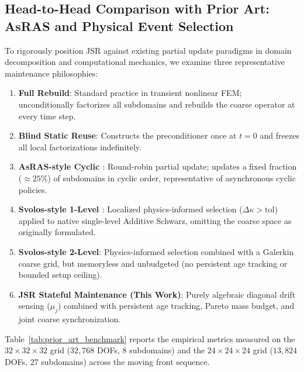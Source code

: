 \documentclass[preprint,12pt,3p]{elsarticle}
\begin{document}
\subsection{Head-to-Head Comparison with Prior Art: AsRAS and Physical Event Selection}
\label{subsec:prior_art_comparison}

To rigorously position JSR against existing partial update paradigms in domain decomposition and computational mechanics, we examine three representative maintenance philosophies:
\begin{enumerate}
    \item \textbf{Full Rebuild}: Standard practice in transient nonlinear FEM; unconditionally factorizes all subdomains and rebuilds the coarse operator at every time step.
    \item \textbf{Blind Static Reuse}: Constructs the preconditioner once at $t=0$ and freezes all local factorizations indefinitely.
    \item \textbf{AsRAS-style Cyclic \cite{berenguer2015asynchronous}}: Round-robin partial update; updates a fixed fraction ($\approx 25\%$) of subdomains in cyclic order, representative of asynchronous cyclic policies.
    \item \textbf{Svolos-style 1-Level \cite{svolos2020updating}}: Localized physics-informed selection ($\Delta \kappa > \text{tol}$) applied to native single-level Additive Schwarz, omitting the coarse space as originally formulated.
    \item \textbf{Svolos-style 2-Level}: Physics-informed selection combined with a Galerkin coarse grid, but memoryless and unbudgeted (no persistent age tracking or bounded setup ceiling).
    \item \textbf{JSR Stateful Maintenance (This Work)}: Purely algebraic diagonal drift sensing ($\mu_j$) combined with persistent age tracking, Pareto mass budget, and joint coarse synchronization.
\end{enumerate}

Table~\ref{tab:prior_art_benchmark} reports the empirical metrics measured on the $32 \times 32 \times 32$ grid ($32,768$ DOFs, 8 subdomains) and the $24 \times 24 \times 24$ grid ($13,824$ DOFs, 27 subdomains) across the moving front sequence.
\end{document}
